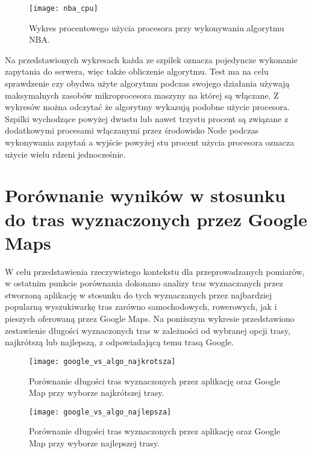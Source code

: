 \begin{figure}[H]
\centering
\texttt{[image: nba\_cpu]}
\caption{Wykres procentowego użycia procesora przy wykonywaniu algorytmu NBA.}
\end{figure}

Na przedstawionych wykresach każda ze szpilek oznacza pojedyncze wykonanie zapytania do serwera, więc także obliczenie algorytmu. Test ma na celu sprawdzenie czy obydwa użyte algorytmu podczas swojego działania używają maksymalnych zasobów mikroprocesora maszyny na której są włączane. Z wykresów można odczytać że algorytmy wykazują podobne użycie procesora. Szpilki wychodzące powyżej dwustu lub nawet trzystu procent są związane z dodatkowymi procesami włączanymi przez środowisko Node podczas wykonywania zapytań a wyjście powyżej stu procent użycia procesora oznacza użycie wielu rdzeni jednocześnie.

\section{Porównanie wyników w stosunku do tras wyznaczonych przez Google Maps}

W celu przedstawienia rzeczywistego kontekstu dla przeprowadzanych pomiarów, w ostatnim punkcie porównania dokonano analizy tras wyznaczanych przez stworzoną aplikację w stosunku do tych wyznaczanych przez najbardziej popularną wyszukiwarkę tras zarówno samochodowych, rowerowych, jak i pieszych oferowaną przez Google Maps. Na poniższym wykresie przedstawiono zestawienie długości wyznaczonych tras w zależności od wybranej opcji trasy, najkrótszą lub najlepszą, z odpowiadającą temu trasą Google.

\begin{figure}[H]
\centering
\texttt{[image: google\_vs\_algo\_najkrotsza]}
\caption{Porównanie długości tras wyznaczonych przez aplikację oraz Google Map przy wyborze najkrótszej trasy.}
\end{figure}

\begin{figure}[H]
\centering
\texttt{[image: google\_vs\_algo\_najlepsza]}
\caption{Porównanie długości tras wyznaczonych przez aplikację oraz Google Map przy wyborze najlepszej trasy.}
\end{figure}

